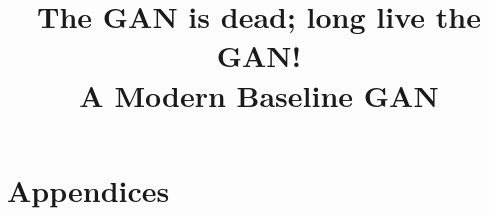 \documentclass{article}
\title{The GAN is dead; long live the GAN!\\A Modern Baseline GAN}
\begin{document}
\maketitle










{\small


}

\appendix
\clearpage
\section*{Appendices}



\clearpage

\end{document}
